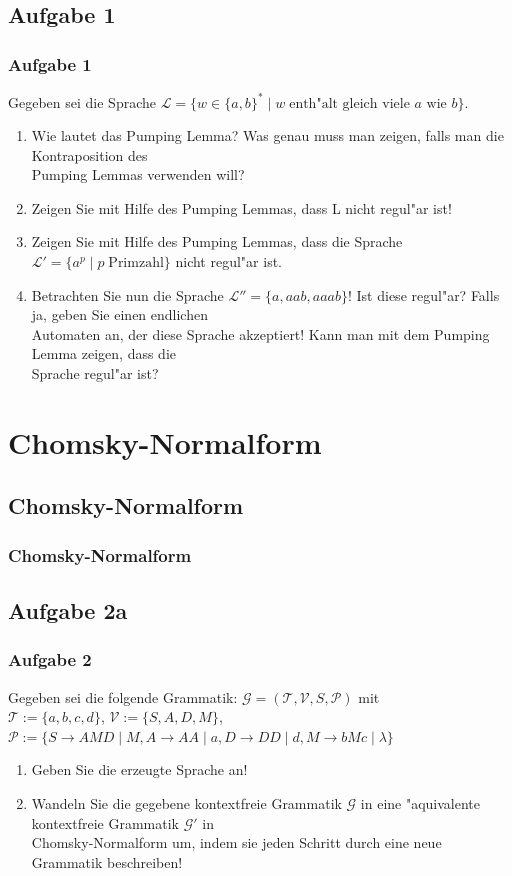 \subsection{Aufgabe 1}
\begin{frame}
	\frametitle{Aufgabe 1}
	Gegeben sei die Sprache $\mathcal{L} = \{w \in \{a,b\}^* \; | \; w \;
	\mbox{enth"alt gleich viele $a$ wie $b$}\}$.
	\begin{enumerate}
		\item Wie lautet das Pumping Lemma? Was genau muss man zeigen, falls man die
		Kontraposition des\\
		Pumping Lemmas verwenden will?
		\item Zeigen Sie mit Hilfe des Pumping Lemmas, dass L nicht regul"ar ist!
		\item Zeigen Sie mit Hilfe des Pumping Lemmas, dass die Sprache $\mathcal{L}' =
		\{a^p\; | \; p \; \mbox{Primzahl}\}$ nicht regul"ar ist.
		\item Betrachten Sie nun die Sprache $\mathcal{L}'' = \{a,aab,aaab\}$! Ist diese
		regul"ar? Falls ja, geben Sie einen endlichen\\
		Automaten an, der diese Sprache akzeptiert! Kann man mit dem Pumping Lemma zeigen,
		dass die\\
		Sprache regul"ar ist?
	\end{enumerate}
\end{frame}

\section{Chomsky-Normalform}
\subsection{Chomsky-Normalform}
\begin{frame}
	\frametitle{Chomsky-Normalform}
\end{frame}

\subsection{Aufgabe 2a}
\begin{frame}
	\frametitle{Aufgabe 2}
	Gegeben sei die folgende Grammatik: $\mathcal{G} = (\mathcal{T},\mathcal{V},S,
	\mathcal{P})$ mit\\
	$\mathcal{T} := \{a,b,c,d\}$, $\mathcal{V} := \{S,A,D,M\}$, $\mathcal{P} := \{
	S \rightarrow AMD \; | \; M, A \rightarrow AA \; | \; a, D \rightarrow DD \; | \; d,
	M \rightarrow bMc \; | \; \lambda\}$
	\begin{enumerate}
		\item Geben Sie die erzeugte Sprache an!
		\item Wandeln Sie die gegebene kontextfreie Grammatik $\mathcal{G}$ in eine
		"aquivalente kontextfreie Grammatik $\mathcal{G}'$ in\\
		Chomsky-Normalform um, indem sie jeden Schritt durch eine neue Grammatik beschreiben!
	\end{enumerate}
\end{frame}

